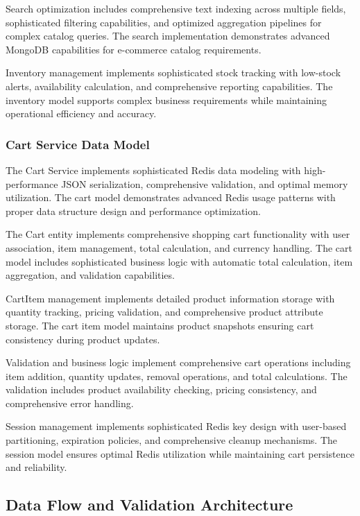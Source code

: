Search optimization includes comprehensive text indexing across multiple fields, sophisticated filtering capabilities, and optimized aggregation pipelines for complex catalog queries. The search implementation demonstrates advanced MongoDB capabilities for e-commerce catalog requirements.

Inventory management implements sophisticated stock tracking with low-stock alerts, availability calculation, and comprehensive reporting capabilities. The inventory model supports complex business requirements while maintaining operational efficiency and accuracy.

\subsubsection{Cart Service Data Model}

The Cart Service implements sophisticated Redis data modeling with high-performance JSON serialization, comprehensive validation, and optimal memory utilization. The cart model demonstrates advanced Redis usage patterns with proper data structure design and performance optimization.

The Cart entity implements comprehensive shopping cart functionality with user association, item management, total calculation, and currency handling. The cart model includes sophisticated business logic with automatic total calculation, item aggregation, and validation capabilities.

CartItem management implements detailed product information storage with quantity tracking, pricing validation, and comprehensive product attribute storage. The cart item model maintains product snapshots ensuring cart consistency during product updates.

Validation and business logic implement comprehensive cart operations including item addition, quantity updates, removal operations, and total calculations. The validation includes product availability checking, pricing consistency, and comprehensive error handling.

Session management implements sophisticated Redis key design with user-based partitioning, expiration policies, and comprehensive cleanup mechanisms. The session model ensures optimal Redis utilization while maintaining cart persistence and reliability.

\subsection{Data Flow and Validation Architecture}

